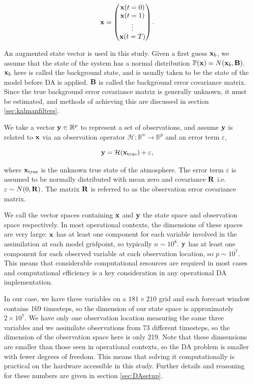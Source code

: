 \[
\mathbf{x} = \begin{pmatrix} \mathbf{x} (t = 0) \\ \mathbf{x} (t = 1) \\ \vdots \\ \mathbf{x} (t = T) \end{pmatrix}.
\]

An augmented state vector is used in this study. Given a first guess $\mathbf{x}_b$, we assume that the state of the system has a normal distribution $\mathbb{P}(\mathbf{x}) = N(\mathbf{x}_b,\mathbf{B})$. $\mathbf{x}_b$ here is called the background state, and is usually taken to be the state of the model before DA is applied. $\mathbf{B}$ is called the background error covariance matrix. Since the true background error covariance matrix is generally unknown, it must be estimated, and methods of achieving this are discussed in section \ref{sec:kalmanfilters}.

We take a vector $\mathbf{y} \in \mathbb{R}^p$ to represent a set of observations, and assume $\mathbf{y}$ is related to $\mathbf{x}$ via an observation operator $\mathcal{H}: \mathbb{R}^n \rightarrow \mathbb{R}^p$ and an error term $\varepsilon$,

\[
\mathbf{y} = \mathcal{H}(\mathbf{x}_\text{true}) + \varepsilon,
\]

where $\mathbf{x}_\text{true}$ is the unknown true state of the atmosphere. The error term $\varepsilon$ is assumed to be normally distributed with mean zero and covariance $\mathbf{R}$ i.e. $\varepsilon \sim N(0,\mathbf{R})$. The matrix $\mathbf{R}$ is referred to as the observation error covariance matrix.

We call the vector spaces containing $\mathbf{x}$ and $\mathbf{y}$ the state space and observation space respectively. In most operational contexts, the dimensions of these spaces are very large: $\mathbf{x}$ has at least one component for each variable involved in the assimilation at each model gridpoint, so typically $n \sim 10^8$. $\mathbf{y}$ has at least one component for each observed variable at each observation location, so $p \sim 10^7$. This means that considerable computational resources are required in most cases and computational efficiency is a key consideration in any operational DA implementation.

In our case, we have three variables on a $181 \times 210$ grid and each forecast window contains 169 timesteps, so the dimension of our state space is approximately $2 \times 10^7$. We have only one observation location measuring the same three variables and we assimilate observations from 73 different timesteps, so the dimension of the observation space here is only 219. Note that these dimsensions are smaller than those seen in operational contexts, so the DA problem is smaller with fewer degrees of freedom. This means that solving it computationally is practical on the hardware accessible in this study. Further details and reasoning for these numbers are given in section \ref{sec:DAsetup}.

